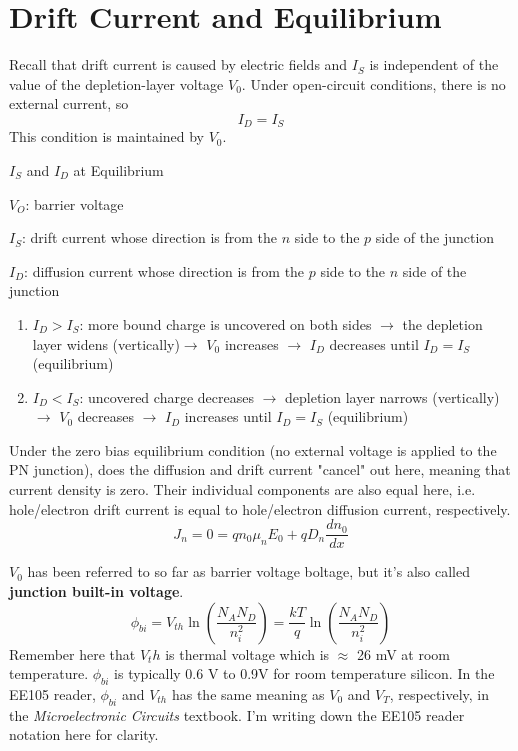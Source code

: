 \section{Drift Current and Equilibrium}
Recall that drift current is caused by electric fields and $I_S$ is independent of the value of the depletion-layer voltage $V_0$. Under open-circuit conditions, there is no external current, so 
    \[I_D = I_S\]
This condition is maintained by $V_0$.
\begin{Analysis}{$I_S$ and $I_D$ at Equilibrium}{}
    \begin{gline}
        \item $V_O$: barrier voltage
        \item $I_S$: drift current whose direction is from the $n$ side to the $p$ side of the junction
        \item $I_D$: diffusion current whose direction is from the $p$ side to the $n$ side of the junction
    \end{gline}
    \begin{enumerate}
        \item \textbf{$I_D > I_S$}: more bound charge is uncovered on both sides $\rightarrow$ the depletion layer widens (vertically)$\rightarrow$ $V_0$ increases $\rightarrow$ $I_D$ decreases until $I_D = I_S$ (equilibrium)
        \item \textbf{$I_D < I_S$}: uncovered charge decreases $\rightarrow$ depletion layer narrows (vertically) $\rightarrow$ $V_0$ decreases $\rightarrow$ $I_D$ increases until $I_D = I_S$ (equilibrium)
    \end{enumerate}
\end{Analysis}

Under the zero bias equilibrium condition (no external voltage is applied to the PN junction), does the diffusion and drift current "cancel" out here, meaning that current density is zero. Their individual components are also equal here, i.e. hole/electron drift current is equal to hole/electron diffusion current, respectively.
    \[J_n = 0 = qn_0 \mu_n E_0 + q D_n \frac{dn_0}{dx}\]

$V_0$ has been referred to so far as barrier voltage boltage, but it's also called \textbf{junction built-in voltage}.
    \[\phi_{bi} = V_{th} \ln \left(\frac{N_A N_D}{n_i^2}\right) = \frac{kT}{q} \ln \left(\frac{N_A N_D}{n_i^2}\right)\]
Remember here that $V_th$ is thermal voltage which is $\approx$ 26 mV at room temperature. $\phi_{bi}$ is typically 0.6 V to 0.9V for room temperature silicon. In the EE105 reader, $\phi_{bi}$ and $V_{th}$ has the same meaning as $V_0$ and $V_T$, respectively, in the \textit{Microelectronic Circuits} textbook. I'm writing down the EE105 reader notation here for clarity.

